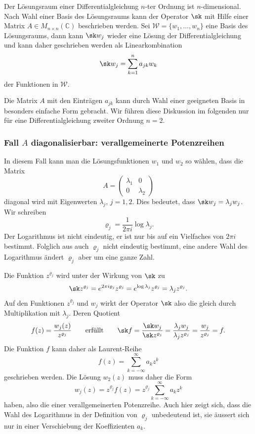 Der Lösungsraum einer Differentialgleichung $n$-ter Ordnung
ist $n$-dimensional.
Nach Wahl einer Basis des Lösungsraums kann der Operator $\sk$
mit Hilfe einer Matrix $A\in M_{n\times n}(\mathbb{C})$ beschrieben werden.
Sei $\mathscr{W}=\{w_1,\dots,w_n\}$ eine Basis des Lösungsraums, dann
kann $\sk w_j$ wieder eine Lösung der Differentialgleichung
und kann daher geschrieben werden als Linearkombination
\begin{equation}
\sk w_j
=
\sum_{k=1}^n
a_{jk} w_k
\end{equation}
der Funktionen in $\mathscr{W}$.

Die Matrix $A$ mit den Einträgen $a_{jk}$ kann durch Wahl einer
geeigneten Basis in besonders einfache Form gebracht.
Wir führen diese Diskussion im folgenden nur für eine Differentialgleichung
zweiter Ordnung $n=2$.

%
%
\subsubsection{Fall $A$ diagonalisierbar: verallgemeinerte Potenzreihen}
In diesem Fall kann man die Lösungsfunktionen $w_1$ und $w_2$ so
wählen, dass die Matrix
\[
A=\begin{pmatrix}\lambda_1&0\\0&\lambda_2\end{pmatrix}
\]
diagonal wird mit Eigenwerten $\lambda_j$, $j=1,2$.
Dies bedeutet, dass $\sk w_j = \lambda_j w_j$.
Wir schreiben
\[
\varrho_j = \frac{1}{2\pi i} \log\lambda_j.
\]
Der Logarithmus ist nicht eindeutig, er ist nur bis auf ein Vielfaches
von $2\pi i$ bestimmt.
Folglich aus auch $\varrho_j$ nicht eindeutig bestimmt, eine
andere Wahl des Logarithmus ändert $\varrho_j$ aber um eine ganze Zahl.

Die Funktion $z^{\varrho_j}$ wird unter der Wirkung von $\sk$ zu
\[
\sk z^{\varrho_j}
=
e^{2\pi i\varrho_j} z^{\varrho_j}
=
e^{\log \lambda_j} z^{\varrho_j}
=
\lambda_j z^{\varrho_j}.
\]
Auf den Funktionen $z^{\varrho_j}$ und $w_j$ wirkt der Operator $\sk$
also die gleich durch Multiplikation mit $\lambda_j$.
Deren Quotient
\[
f(z) = \frac{w_j(z)}{z^{\varrho_j}}
\qquad\text{erfüllt}\qquad
\sk f
=
\frac{\sk w_j}{\sk z^{\varrho_j}}
=
\frac{\lambda_j w_j}{\lambda_j z^{\varrho_j}}
=
\frac{w_j}{z^{\varrho_j}}
=
f.
\]
Die Funktion $f$ kann daher als Laurent-Reihe
\[
f(z) 
=
\sum_{k=-\infty}^\infty a_kz^k
\]
geschrieben werden.
Die Lösung $w_2(z)$ muss daher die Form
\begin{equation}
w_j(z)
=
z^{\varrho_j} f(z)
=
z^{\varrho_j} \sum_{k=-\infty}^\infty a_kz^k
\end{equation}
haben, also die einer verallgemeinerten Potenzreihe.
Auch hier zeigt sich, dass die Wahl des Logarithmus in der Definition
von $\varrho_j$ unbedeutend ist, sie äussert sich nur in einer
Verschiebung der Koeffizienten $a_k$.

